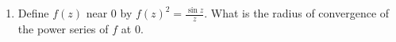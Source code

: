 \documentclass{article}
\begin{document}
\begin{enumerate}
\begin{proof}
	\end{proof}
	
	\setcounter{enumi}{7}
	
	\item Define $f(z)$ near $0$ by $f(z)^2 = \frac{\sin z}{z}$. What is the radius of convergence of the power series of $f$ at $0$.
	
%		
%	
%	
%		
%	
%	
%	
%	
\end{enumerate}
\end{document}

